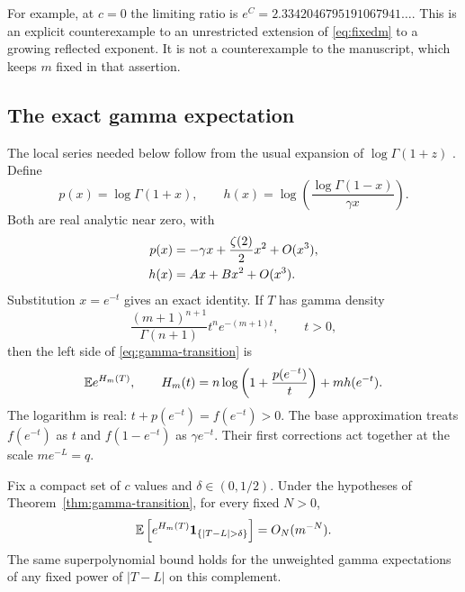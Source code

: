 For example, at $c=0$ the limiting ratio is
$e^C=2.3342046795191067941\ldots$. This is an explicit counterexample
to an unrestricted extension of \eqref{eq:fixedm} to a growing reflected
exponent. It is not a counterexample to the manuscript, which keeps $m$
fixed in that assertion.

\subsection{The exact gamma expectation}
The local series needed below follow from the usual expansion of
$\log\Gamma(1+z)$ \cite{DLMFgamma}. Define
\[
 p(x)=\log\Gamma(1+x),\qquad
 h(x)=\log\left(\frac{\log\Gamma(1-x)}{\gamma x}\right).
\]
Both are real analytic near zero, with
\begin{align}\label{eq:gamma-germs}
 p(x)&=-\gamma x+\frac{\zeta(2)}2x^2+O(x^3),\\
 h(x)&=Ax+Bx^2+O(x^3).\notag
\end{align}
Substitution $x=e^{-t}$ gives an exact identity. If $T$ has gamma
density
\begin{equation}\label{eq:gamma-density}
 \frac{(m+1)^{n+1}}{\Gamma(n+1)}t^n e^{-(m+1)t},\qquad t>0,
\end{equation}
then the left side of \eqref{eq:gamma-transition} is
\begin{equation}\label{eq:gamma-expectation}
 \mathbb E e^{H_m(T)},\qquad
 H_m(t)=n\log\left(1+\frac{p(e^{-t})}{t}\right)+mh(e^{-t}).
\end{equation}
The logarithm is real: $t+p(e^{-t})=f(e^{-t})>0$.
The base approximation treats $f(e^{-t})$ as $t$ and
$f(1-e^{-t})$ as $\gamma e^{-t}$. Their first corrections act
together at the scale $me^{-L}=q$.

\begin{lemma}\label{lem:gamma-localization}
Fix a compact set of $c$ values and $\delta\in(0,1/2)$. Under the
hypotheses of Theorem~\ref{thm:gamma-transition}, for every fixed $N>0$,
\[
 \E\left[e^{H_m(T)}\mathbf1_{\{|T-L|>\delta\}}\right]
       =O_N(m^{-N}).
\]
The same superpolynomial bound holds for the unweighted gamma
expectations of any fixed power of $|T-L|$ on this complement.
\end{lemma}

